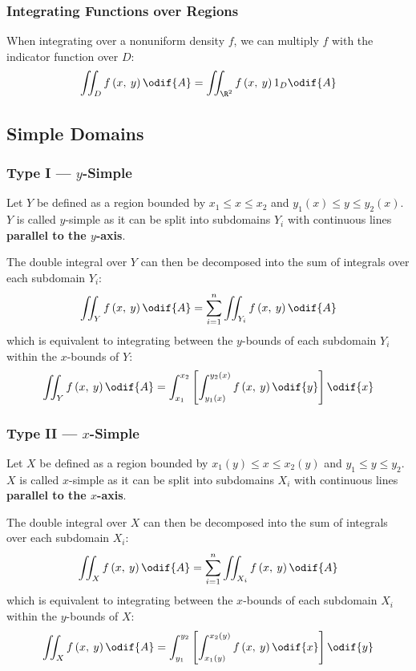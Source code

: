 \documentclass{article}
\begin{document}
\subsubsection{Integrating Functions over Regions}
When integrating over a nonuniform density \(f\), we can multiply \(f\)
with the indicator function over \(D\):
\begin{equation*}
    \iint_D f\left( x,\: y \right) \odif{A} = \iint_{\R^2} f\left( x,\: y \right) 1_D \odif{A}
\end{equation*}
\subsection{Simple Domains}
\subsubsection{Type I --- \texorpdfstring{\(y\)}{y}-Simple}
Let \(Y\) be defined as a region bounded by
\(x_1 \leqslant x \leqslant x_2\) and
\(y_1\left( x \right) \leqslant y \leqslant y_2\left( x \right)\).
\(Y\) is called \(y\)-simple as it can be split into subdomains \(Y_i\)
with continuous lines \textbf{parallel to the \(y\)-axis}.

The double integral over \(Y\) can then be decomposed into the sum of
integrals over each subdomain \(Y_i\):
\begin{equation*}
    \iint_Y f\left( x,\: y \right) \odif{A} = \sum_{i = 1}^n \iint_{Y_i} f\left( x,\: y \right) \odif{A}
\end{equation*}
which is equivalent to integrating between the \(y\)-bounds of each
subdomain \(Y_i\) within the \(x\)-bounds of \(Y\):
\begin{equation*}
    \iint_Y f\left( x,\: y \right) \odif{A} = \int_{x_1}^{x_2} \left[ \int_{y_1\left( x \right)}^{y_2\left( x \right)} f\left( x,\: y \right) \odif{y} \right] \odif{x}
\end{equation*}
\subsubsection{Type II --- \texorpdfstring{\(x\)}{x}-Simple}
Let \(X\) be defined as a region bounded by
\(x_1\left( y \right) \leqslant x \leqslant x_2\left( y \right)\) and
\(y_1 \leqslant y \leqslant y_2\).
\(X\) is called \(x\)-simple as it can be split into subdomains \(X_i\)
with continuous lines \textbf{parallel to the \(x\)-axis}.

The double integral over \(X\) can then be decomposed into the sum of
integrals over each subdomain \(X_i\):
\begin{equation*}
    \iint_X f\left( x,\: y \right) \odif{A} = \sum_{i = 1}^n \iint_{X_i} f\left( x,\: y \right) \odif{A}
\end{equation*}
which is equivalent to integrating between the \(x\)-bounds of each
subdomain \(X_i\) within the \(y\)-bounds of \(X\):
\begin{equation*}
    \iint_X f\left( x,\: y \right) \odif{A} = \int_{y_1}^{y_2} \left[ \int_{x_1\left( y \right)}^{x_2\left( y \right)} f\left( x,\: y \right) \odif{x} \right] \odif{y}
\end{equation*}
\end{document}
